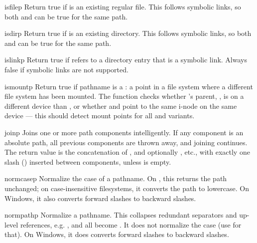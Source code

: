 \begin{funcdesc}{isfile}{p}
Return true if  is an existing regular file.  This follows
symbolic links, so both  and 
can be true for the same path.
\end{funcdesc}

\begin{funcdesc}{isdir}{p}
Return true if  is an existing directory.  This follows
symbolic links, so both  and  can
be true for the same path.
\end{funcdesc}

\begin{funcdesc}{islink}{p}
Return true if
refers to a directory entry that is a symbolic link.
Always false if symbolic links are not supported.
\end{funcdesc}

\begin{funcdesc}{ismount}{p}
Return true if pathname  is a : a point in a
file system where a different file system has been mounted.  The
function checks whether 's parent, , is on a
different device than , or whether  and
 point to the same i-node on the same device --- this should
detect mount points for all \UNIX{} and \POSIX{} variants.
\end{funcdesc}

\begin{funcdesc}{join}{p}
Joins one or more path components intelligently.  If any component is
an absolute path, all previous components are thrown away, and joining
continues.  The return value is the concatenation of , and
optionally , etc., with exactly one slash () inserted
between components, unless  is empty.
\end{funcdesc}

\begin{funcdesc}{normcase}{p}
Normalize the case of a pathname.  On \UNIX{}, this returns the path
unchanged; on case-insensitive filesystems, it converts the path to
lowercase.  On Windows, it also converts forward slashes to backward
slashes.
\end{funcdesc}

\begin{funcdesc}{normpath}{p}
Normalize a pathname.  This collapses redundant separators and
up-level references, e.g. ,  and
 all become .  It does not normalize the
case (use  for that).  On Windows, it does
converts forward slashes to backward slashes.
\end{funcdesc}


